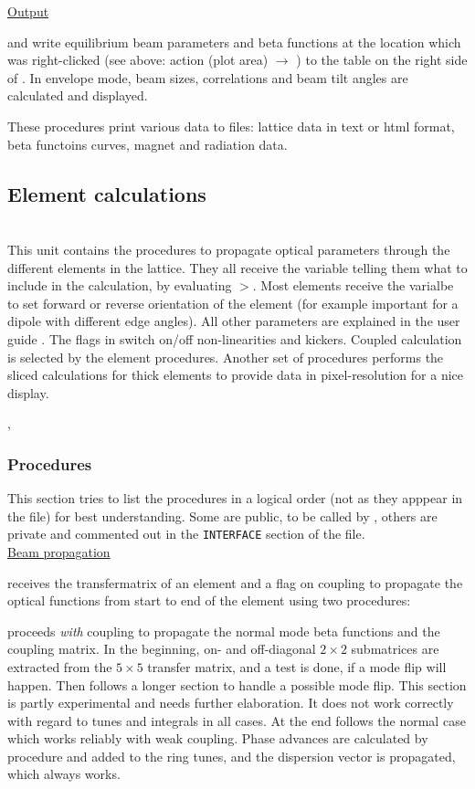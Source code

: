 \documentclass[12pt]{article}
\newcommand\code[1]{{\tt #1}}
\newcommand{\ofldx}[1]{\colorbox{black!15}{{\color{black}(#1)}}}
\newcommand\guico[1]{{\color{blue}\code{#1}}}
\newcommand{\unico}[1]{{\color{burntorange}\code{#1}}}
\newcommand{\evcodx}[2]{\ofldx{#1} $\rightarrow$ \guico{#2}}
\newcommand{\prcod}[2]{\opauni{#1}$>$\unico{#2}}
\newcommand{\opagui}[1]{\colorbox{blue!20}{{\color{black}\code{#1}}}}
\newcommand{\ogui}[1]{\hyperref[#1]{\opagui{#1}}}
\newcommand{\opauni}[1]{\colorbox{orange!30}{{\color{black}\code{#1}}}}
\newcommand{\ounih}[2]{\subsection{\label{#2}#1}{\Huge\opauni{#2}}\\}
\newcommand{\ouni}[1]{\hyperref[#1]{\opauni{#1}}}
\newcommand{\uses}[1]{\flushleft {\bf Uses:} #1}
\newcommand{\desc}[1]{#1}
\newcommand{\todo}[1]{{\color{red} #1}}
\begin{document}
{\underline{Output}

\unico{FillBeamTab} and \unico{FillBetaTab} write equilibrium beam parameters and beta functions at the location which was right-clicked (see above: \ogui{opalinop} action \evcodx{plot area}{pwMouseDown}) to the table on the right side of \ogui{opalinop}. In envelope mode, beam sizes, correlations and beam tilt angles are calculated and displayed. 

\unico{Print\dots} These procedures print various data to files: lattice data in text or html format, beta functoins curves, magnet and radiation data.
}

\ounih{Element calculations}{elemlib} 

\desc{This unit contains the procedures to propagate optical parameters through the different elements in the lattice. They all receive the variable \unico{mode} telling them what to include in the calculation, by evaluating \prcod{elemlib}{switch}. Most elements receive the varialbe \unico{idir} to set forward or reverse orientation of the element (for example important for a dipole with different edge angles). All other parameters are explained in the user guide \cite{userguide}. 
The flags \unico{UseSext,UsePulsed} in \ouni{globlib} switch on/off non-linearities and kickers. Coupled calculation is selected by the element procedures. Another set of procedures performs the sliced calculations for thick elements to provide data in pixel-resolution for a nice display. 
}

\uses{\ouni{globlib}, \ouni{mathlib}}

\subsubsection*{Procedures}

This section tries to list the procedures in a logical order (not as they apppear in the file) for best understanding. Some are public, to be called by \ouni{linoplib}, others are private and commented out in the \code{INTERFACE} section of the file.\\

\underline{Beam propagation}

\unico{Propagate} receives the transfermatrix of an element and a flag on coupling to propagate the optical functions from start to end of the element using two procedures:

\unico{MCC\_prop} proceeds {\em with} coupling to propagate the normal mode beta functions and the coupling matrix. In the beginning, on- and off-diagonal $2\times 2$ submatrices are extracted from the $5\times 5$ transfer matrix, and a test is done, if a mode flip will happen. Then follows a longer section to handle a possible mode flip. \todo{This section is partly experimental and needs further elaboration. It does not work correctly with regard to tunes and integrals in all cases.} At the end follows the normal case which works reliably with weak coupling. Phase advances are calculated by procedure \unico{PhaseAdvance} and added to the ring tunes, and the dispersion vector is propagated, which always works.
\end{document}
